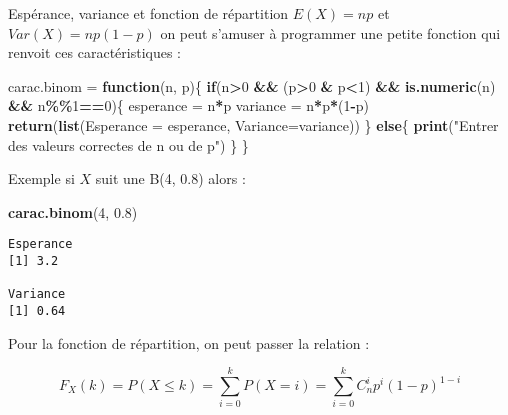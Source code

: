 \documentclass[
  ignorenonframetext,
]{beamer}
\newenvironment{Shaded}{\begin{snugshade}}{\end{snugshade}}
\newcommand{\AttributeTok}[1]{\textcolor[rgb]{0.13,0.29,0.53}{#1}}
\newcommand{\ControlFlowTok}[1]{\textcolor[rgb]{0.13,0.29,0.53}{\textbf{#1}}}
\newcommand{\DecValTok}[1]{\textcolor[rgb]{0.00,0.00,0.81}{#1}}
\newcommand{\FloatTok}[1]{\textcolor[rgb]{0.00,0.00,0.81}{#1}}
\newcommand{\FunctionTok}[1]{\textcolor[rgb]{0.13,0.29,0.53}{\textbf{#1}}}
\newcommand{\NormalTok}[1]{#1}
\newcommand{\OtherTok}[1]{\textcolor[rgb]{0.56,0.35,0.01}{#1}}
\newcommand{\SpecialCharTok}[1]{\textcolor[rgb]{0.81,0.36,0.00}{\textbf{#1}}}
\newcommand{\StringTok}[1]{\textcolor[rgb]{0.31,0.60,0.02}{#1}}
\begin{document}
\begin{frame}[fragile]{Espérance, variance et fonction de répartition}
\protect\hypertarget{espuxe9rance-variance-et-fonction-de-ruxe9partition-2}{}
\(E(X)=np\) et \(Var(X)=np(1-p)\) on peut s'amuser à programmer une
petite fonction qui renvoit ces caractéristiques :

\begin{Shaded}
\begin{Highlighting}[]
\NormalTok{carac.binom }\OtherTok{=} \ControlFlowTok{function}\NormalTok{(n, p)\{}
  \ControlFlowTok{if}\NormalTok{(n}\SpecialCharTok{\textgreater{}}\DecValTok{0} \SpecialCharTok{\&\&}\NormalTok{ (p}\SpecialCharTok{\textgreater{}}\DecValTok{0} \SpecialCharTok{\&}\NormalTok{ p}\SpecialCharTok{\textless{}}\DecValTok{1}\NormalTok{) }\SpecialCharTok{\&\&} \FunctionTok{is.numeric}\NormalTok{(n) }\SpecialCharTok{\&\&}\NormalTok{ n}\SpecialCharTok{\%\%}\DecValTok{1}\SpecialCharTok{==}\DecValTok{0}\NormalTok{)\{}
\NormalTok{      esperance }\OtherTok{=}\NormalTok{ n}\SpecialCharTok{*}\NormalTok{p}
\NormalTok{      variance  }\OtherTok{=}\NormalTok{ n}\SpecialCharTok{*}\NormalTok{p}\SpecialCharTok{*}\NormalTok{(}\DecValTok{1}\SpecialCharTok{{-}}\NormalTok{p)}
      \FunctionTok{return}\NormalTok{(}\FunctionTok{list}\NormalTok{(}\AttributeTok{Esperance =}\NormalTok{ esperance, }\AttributeTok{Variance=}\NormalTok{variance))}
\NormalTok{  \} }\ControlFlowTok{else}\NormalTok{\{}
    \FunctionTok{print}\NormalTok{(}\StringTok{"Entrer des valeurs correctes de n ou de p"}\NormalTok{)}
\NormalTok{  \}}
\NormalTok{\}}
\end{Highlighting}
\end{Shaded}
\end{frame}

\begin{frame}[fragile]{Exemple}
\protect\hypertarget{exemple}{}
si \(X\) suit une B(4, 0.8) alors :

\begin{Shaded}
\begin{Highlighting}[]
\FunctionTok{carac.binom}\NormalTok{(}\DecValTok{4}\NormalTok{, }\FloatTok{0.8}\NormalTok{)}
\end{Highlighting}
\end{Shaded}

\begin{verbatim}
Esperance
[1] 3.2
 
Variance
[1] 0.64
\end{verbatim}

Pour la fonction de répartition, on peut passer la relation :

\[F_X (k) = P(X\le k) = \sum_{i=0}^k P(X=i) = \sum_{i=0}^k C_n^i p^i (1-p)^{1-i}\]
\end{frame}
\end{document}
